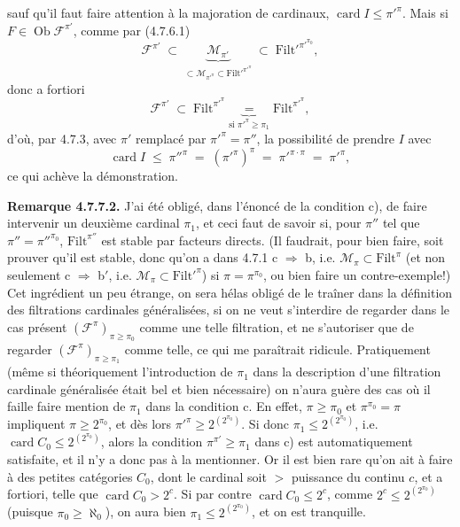 \documentclass[11pt]{article}
\newcommand{\printedpage}[1]{\marginpar{\footnotesize p.~#1}}
\newcommand{\msp}[1]{\marginpar{\footnotesize [#1]}}
\newcommand{\Ob}{\operatorname{Ob}}
\newcommand{\Filt}{\mathrm{Filt}}
\newcommand{\card}{\operatorname{card}}
\begin{document}
\noindent\printedpage{59}
sauf qu'il faut faire attention à la majoration de cardinaux, $\card I \leqslant \pi'^{\pi}$. Mais si $F \in \Ob\mathcal{F}^{\pi'}$, comme par (4.7.6.1)
\[
\mathcal{F}^{\pi'} \;\subset\; \underbrace{\mathcal{M}_{\pi'}}_{\subset\mathcal{M}_{\pi'^{\pi}}\subset\Filt'^{\pi'^{\pi}}} \;\subset\; \Filt'^{\pi'^{\pi_0}} ,
\]
donc a fortiori
\[
\mathcal{F}^{\pi'} \;\subset\; \Filt^{\pi'^{\pi}} \underbrace{\;=\;}_{\text{si } \pi'^{\pi}\geqslant\pi_1} \Filt^{\pi'^{\pi}} , %
\]
d'où, par 4.7.3, avec $\pi'$ remplacé par $\pi'^{\pi}=\pi''$, la possibilité de prendre $I$ avec
\[
\card I \;\leqslant\; \pi''^{\pi} \;=\; (\pi'^{\pi})^{\pi} \;=\; \pi'^{\pi\cdot\pi} \;=\; \pi'^{\pi} ,
\]
ce qui achève la démonstration.

\noindent\msp{page 175}\textbf{Remarque 4.7.7.2.} J'ai été obligé, dans l'énoncé de la condition c), de faire intervenir un deuxième cardinal $\pi_1$, et ceci faut de savoir si, pour $\pi''$ tel que $\pi''=\pi''^{\pi_0}$, $\Filt^{\pi''}$ est stable par facteurs directs. (Il faudrait, pour bien faire, soit prouver qu'il est stable, donc qu'on a dans 4.7.1 c $\Longrightarrow$ b, i.e. $\mathcal{M}_\pi\subset\Filt^{\pi}$ (et non seulement c $\Longrightarrow$ b$'$, i.e. $\mathcal{M}_\pi\subset\Filt'^{\pi}$) si $\pi=\pi^{\pi_0}$, ou bien faire un contre-exemple!) Cet ingrédient un peu étrange, on sera hélas obligé de le traîner dans la définition des filtrations cardinales généralisées, si on ne veut s'interdire de regarder dans le cas présent $(\mathcal{F}^{\pi})_{\pi\geqslant\pi_0}$ comme une telle filtration, et ne s'autoriser que de regarder $(\mathcal{F}^{\pi})_{\pi\geqslant\pi_1}$ comme telle, ce qui me paraîtrait ridicule. Pratiquement (même si théoriquement l'introduction de $\pi_1$ dans la description d'une filtration cardinale généralisée était bel et bien nécessaire) on n'aura guère des cas où il faille faire mention de $\pi_1$ dans la condition c. En effet, $\pi\geqslant\pi_0$ et $\pi^{\pi_0}=\pi$ impliquent $\pi\geqslant 2^{\pi_0}$, et dès lors $\pi'^{\pi}\geqslant 2^{(2^{\pi_0})}$. Si donc $\pi_1\leqslant 2^{(2^{\pi_0})}$, i.e. $\card C_0\leqslant 2^{(2^{\pi_0})}$, alors la condition $\pi^{\pi'}\geqslant\pi_1$ dans c) est automatiquement satisfaite, et il n'y a donc pas à la mentionner. Or il est bien rare qu'on ait à faire à des petites catégories $C_0$, dont le cardinal soit $>$ puissance %
\msp{page 176}
du continu $c$, et a fortiori, telle que $\card C_0 > 2^{c}$. Si par contre $\card C_0\leqslant 2^{c}$, comme $2^{c}\leqslant 2^{(2^{\pi_0})}$ (puisque $\pi_0\geqslant\aleph_0$), on aura bien $\pi_1\leqslant 2^{(2^{\pi_0})}$, et on est tranquille.
\end{document}
